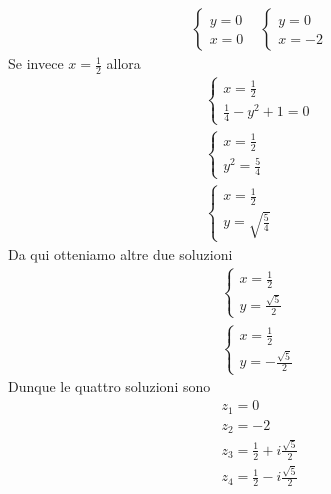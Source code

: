 \begin{example}
\begin{align*}
		\begin{cases}
			y = 0 \\
			x = 0
		\end{cases} &
		\begin{cases}
			y = 0 \\
			x = -2
		\end{cases}
	\end{align*}
	Se invece $x = \frac{1}{2}$ allora
	\begin{gather*}
		\begin{cases}
			x = \frac{1}{2} \\
			\frac{1}{4} - y^2 + 1 = 0
		\end{cases} \\
		\begin{cases}
			x = \frac{1}{2} \\
			y^2 = \frac{5}{4}
		\end{cases} \\
		\begin{cases}
			x = \frac{1}{2} \\
			y = \sqrt{\frac{5}{4}}
		\end{cases}
	\end{gather*}
	Da qui otteniamo altre due soluzioni
	\begin{gather*}
		\begin{cases}
			x = \frac{1}{2} \\
			y = \frac{\sqrt{5}}{2}
		\end{cases} \\
		\begin{cases}
			x = \frac{1}{2} \\
			y = -\frac{\sqrt{5}}{2}
		\end{cases}
	\end{gather*}
	Dunque le quattro soluzioni sono
	\begin{gather*}
		z_1 = 0 \\
		z_2 = -2 \\
		z_3 = \frac{1}{2} + i \frac{\sqrt{5}}{2} \\
		z_4 = \frac{1}{2} - i \frac{\sqrt{5}}{2}
	\end{gather*}
\end{example}

